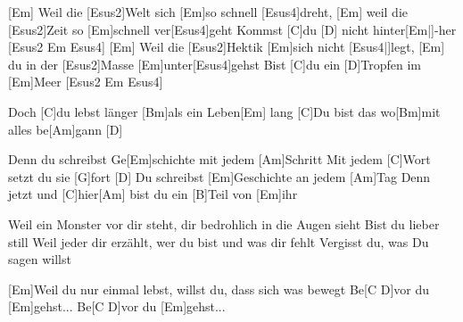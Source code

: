

\hspace*{\fill}{\footnotesize(Capo 1. Bund)}

\begin{guitar}
	[Em] Weil die [Esus2]Welt sich [Em]so schnell [Esus4]dreht, [Em] weil die [Esus2]Zeit so [Em]schnell ver[Esus4]geht
	Kommst [C]du [D] nicht hinter[Em|]{-}her [Esus2 Em Esus4]{}
	[Em] Weil die [Esus2]Hektik [Em]sich nicht [Esus4|]{legt,  }[Em] du in der [Esus2]Masse [Em]unter[Esus4]gehst
	Bist [C]du ein [D]Tropfen im [Em]Meer [Esus2 Em Esus4]{}
	
	Doch [C]du lebst länger [Bm]als ein Leben[Em] lang
	[C]Du bist das wo[Bm]mit alles be[Am]gann [D]{}
	
	Denn du schreibst Ge[Em]schichte mit jedem [Am]Schritt
	Mit jedem [C]Wort setzt du sie [G]fort [D]{}
	Du schreibst [Em]Geschichte an jedem [Am]Tag
	Denn jetzt und [C]hier[Am] bist du ein [B]Teil von [Em]ihr
	
	Weil ein Monster vor dir steht, dir bedrohlich in die Augen sieht
	Bist du lieber still
	Weil jeder dir erzählt, wer du bist und was dir fehlt
	Vergisst du, was Du sagen willst
	
	 
	
	 
	
	[Em]Weil du nur einmal lebst, willst du, dass sich was bewegt
	Be[C D]vor du [Em]gehst...
	Be[C D]vor du [Em]gehst...
	
	 
	
	 
\end{guitar}